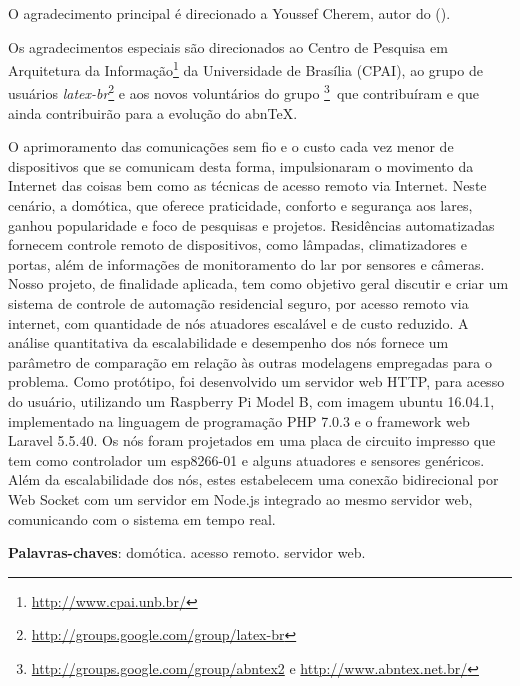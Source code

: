 \documentclass[
12pt,				%
openany,			%
twoside,			%
a4paper,			%
english,			%
french,				%
spanish,			%
brazil,				%
]{abntex2}
\begin{document}
    \begin{agradecimentos}
        O agradecimento principal é direcionado a Youssef Cherem, autor do
         ().

        Os agradecimentos especiais são direcionados ao Centro de Pesquisa em
        Arquitetura da Informação\footnote{\url{http://www.cpai.unb.br/}} da Universidade de
        Brasília (CPAI), ao grupo de usuários
        \emph{latex-br}\footnote{\url{http://groups.google.com/group/latex-br}} e aos
        novos voluntários do grupo
        \emph{\abnTeX}\footnote{\url{http://groups.google.com/group/abntex2} e
        \url{http://www.abntex.net.br/}}~que contribuíram e que ainda
        contribuirão para a evolução do abn\TeX.

    \end{agradecimentos}
\fi


\setlength{\absparsep}{18pt} %
\begin{resumo}

    O aprimoramento das comunicações sem fio e o custo cada vez menor de
    dispositivos que se comunicam desta forma, impulsionaram o movimento da
    Internet das coisas bem como as técnicas de acesso remoto via Internet. Neste
    cenário, a domótica, que oferece praticidade, conforto e segurança aos lares,
    ganhou popularidade e foco de pesquisas e projetos. Residências
    automatizadas fornecem controle remoto de dispositivos, como lâmpadas,
    climatizadores e portas, além de informações de monitoramento do lar por
    sensores e câmeras. Nosso projeto, de finalidade aplicada, tem como objetivo
    geral discutir e criar um sistema de controle de automação residencial seguro,
    por acesso remoto via internet, com quantidade de nós atuadores escalável e
    de custo reduzido. A análise quantitativa da escalabilidade e desempenho dos
    nós fornece um parâmetro de comparação em relação às outras modelagens
    empregadas para o problema. Como protótipo, foi desenvolvido um servidor
    web HTTP, para acesso do usuário, utilizando um Raspberry Pi Model B, com
    imagem ubuntu 16.04.1, implementado na linguagem de programação PHP
    7.0.3 e o framework web Laravel 5.5.40. Os nós foram projetados em uma
    placa de circuito impresso que tem como controlador um esp8266-01 e alguns
    atuadores e sensores genéricos. Além da escalabilidade dos nós, estes
    estabelecem uma conexão bidirecional por Web Socket com um servidor em
    Node.js integrado ao mesmo servidor web, comunicando com o sistema em
    tempo real.

    \noindent
    \textbf{Palavras-chaves}: domótica. acesso remoto. servidor web.
\end{resumo}
\end{document}
